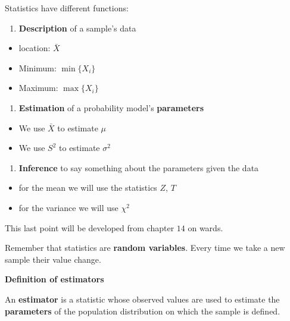 \documentclass[
]{book}
\providecommand{\tightlist}{%
  \setlength{\itemsep}{0pt}\setlength{\parskip}{0pt}}
\begin{document}
Statistics have different functions:

\begin{enumerate}
\def\labelenumi{\arabic{enumi}.}
\tightlist
\item
  \textbf{Description} of a sample's data
\end{enumerate}

\begin{itemize}
\tightlist
\item
  location: \(\bar{X}\)
\item
  Minimum: \(\min\{X_i\}\)
\item
  Maximum: \(\max\{X_i\}\)
\end{itemize}

\begin{enumerate}
\def\labelenumi{\arabic{enumi}.}
\setcounter{enumi}{1}
\tightlist
\item
  \textbf{Estimation} of a probability model's \textbf{parameters}
\end{enumerate}

\begin{itemize}
\tightlist
\item
  We use \(\bar{X}\) to estimate \(\mu\)
\item
  We use \(S^2\) to estimate \(\sigma^2\)
\end{itemize}

\begin{enumerate}
\def\labelenumi{\arabic{enumi}.}
\setcounter{enumi}{2}
\tightlist
\item
  \textbf{Inference} to say something about the parameters given the data
\end{enumerate}

\begin{itemize}
\tightlist
\item
  for the mean we will use the statistics \(Z\), \(T\)
\item
  for the variance we will use \(\chi^2\)
\end{itemize}

This last point will be developed from chapter \(14\) on wards.

Remember that statistics are \textbf{random variables}. Every time we take a new sample their value change.

\textbf{Definition of estimators}

An \textbf{estimator} is a statistic whose observed values are used to estimate the \textbf{parameters} of the population distribution on which the sample is defined.
\end{document}
